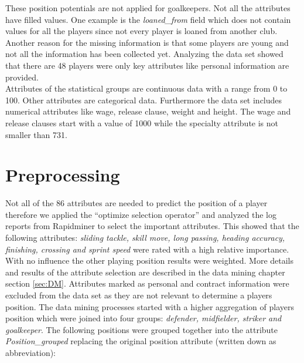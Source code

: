 \documentclass[runningheads]{llncs}
\begin{document}
These position potentials are not applied for goalkeepers. 
Not all the attributes have filled values. One example is the \textit{loaned\_from} field which does not contain values for all the players since not every player is loaned from another club. Another reason for the missing information is that some players are young and not all the information has been collected yet. 
Analyzing the data set showed that there are 48 players were only key attributes like personal information are provided. \\
Attributes of the statistical groups are continuous data with a range from 0 to 100. Other attributes are categorical data. Furthermore the data set includes numerical attributes like wage, release clause, weight and height.
The wage and release clauses start with a value of 1000 while the specialty attribute is not smaller than 731.

\section{Preprocessing}
\label{sec:preprocessing}
Not all of the 86 attributes are needed to predict the position of a player therefore we applied the ``optimize selection operator'' and analyzed the log reports from Rapidminer to select the important attributes.
This showed that the following attributes:\textit{ sliding tackle, skill move, long passing, heading accuracy, finishing, crossing and sprint speed} were rated with a high relative importance. With no influence the other playing position results were weighted. More details and results of the attribute selection are described in the data mining chapter section \ref{sec:DM}.
Attributes marked as personal and contract information were excluded from the data set as they are not relevant to determine a players position. 
The data mining processes started with a higher aggregation of players position which were joined into four groups: \textit{defender, midfielder, striker and goalkeeper}. The following positions were grouped together into the attribute  \textit{Position\_grouped} replacing the original position attribute (written down as abbreviation):
\end{document}
